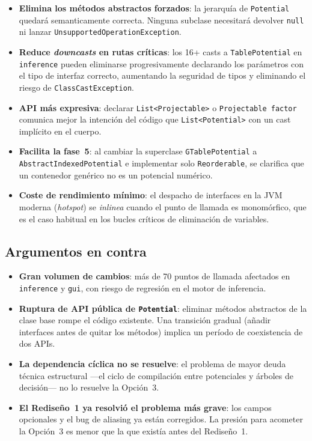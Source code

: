 \documentclass[11pt,a4paper]{article}
\newcommand{\code}[1]{\texttt{#1}}
\begin{document}
\begin{itemize}
  \item \textbf{Elimina los métodos abstractos forzados}: la jerarquía de
        \code{Potential} quedará semanticamente correcta.  Ninguna subclase
        necesitará devolver \code{null} ni lanzar \code{UnsupportedOperationException}.

  \item \textbf{Reduce \emph{downcasts} en rutas críticas}: los 16+ casts a
        \code{TablePotential} en \code{inference} pueden eliminarse progresivamente
        declarando los parámetros con el tipo de interfaz correcto, aumentando la
        seguridad de tipos y eliminando el riesgo de \code{ClassCastException}.

  \item \textbf{API más expresiva}: declarar \code{List<Projectable>} o
        \code{Projectable factor} comunica mejor la intención del código que
        \code{List<Potential>} con un cast implícito en el cuerpo.

  \item \textbf{Facilita la fase~5}: al cambiar la superclase \code{GTablePotential} a
        \code{AbstractIndexedPotential} e implementar solo \code{Reorderable}, se
        clarifica que un contenedor genérico no es un potencial numérico.

  \item \textbf{Coste de rendimiento mínimo}: el despacho de interfaces en la JVM
        moderna (\emph{hotspot}) se \emph{inlinea} cuando el punto de llamada es
        monomórfico, que es el caso habitual en los bucles críticos de
        eliminación de variables.
\end{itemize}

\subsection{Argumentos en contra}

\begin{itemize}
  \item \textbf{Gran volumen de cambios}: más de 70 puntos de llamada afectados
        en \code{inference} y \code{gui}, con riesgo de regresión en el motor de
        inferencia.

  \item \textbf{Ruptura de API pública de \code{Potential}}: eliminar métodos
        abstractos de la clase base rompe el código existente.  Una transición
        gradual (añadir interfaces antes de quitar los métodos) implica un
        período de coexistencia de dos APIs.

  \item \textbf{La dependencia cíclica no se resuelve}: el problema de mayor
        deuda técnica estructural ---el ciclo de compilación entre potenciales
        y árboles de decisión--- no lo resuelve la Opción~3.

  \item \textbf{El Rediseño~1 ya resolvió el problema más grave}: los
        campos opcionales y el bug de aliasing ya están corregidos.  La presión
        para acometer la Opción~3 es menor que la que existía antes del
        Rediseño~1.
\end{itemize}
\end{document}
